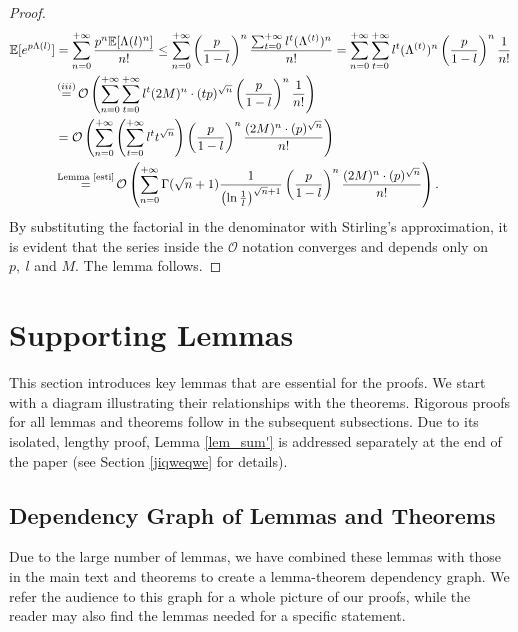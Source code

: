 \documentclass{article} %
\begin{document}
\begin{proof}
\begin{align*}
\mathbb{E}[e^{p\Lambda(l)}] & = \sum_{n=0}^{+\infty} \frac{p^{n}\mathbb{E}[\Lambda(l)^n]}{n!}\le\sum_{n=0}^{+\infty} \left(\frac{p}{1-l}\right)^{n}\frac{\sum_{t=0}^{+\infty}l^{t}(\Lambda^{(t)})^{n}}{n!}  =\sum_{n=0}^{+\infty} \sum_{t=0}^{+\infty}l^{t}(\Lambda^{(t)})^{n}\left(\frac{p}{1-l}\right)^{n}\frac{1}{n!}  \\&\mathop{=}^{(iii)}\mathcal{O}\left(\sum_{n=0}^{+\infty} \sum_{t=0}^{+\infty}l^{t}(2M)^{n}\cdot (tp)^{\sqrt{n}}\left(\frac{p}{1-l}\right)^{n}\frac{1}{n!}\right)\\&=\mathcal{O}\left(\sum_{n=0}^{+\infty} \left(\sum_{t=0}^{+\infty}l^{t}t^{\sqrt{n}}\right)\left(\frac{p}{1-l}\right)^{n}\frac{(2M)^{n}\cdot (p)^{\sqrt{n}}}{n!}\right)\\&\mathop{=}^{\text{Lemma \ref{esti}}}\mathcal{O}\left(\sum_{n=0}^{+\infty} \Gamma(\sqrt{n}+1)\frac{1}{\left( \ln \frac{1}{l} \right)^{\sqrt{n} + 1}}\left(\frac{p}{1-l}\right)^{n}\frac{(2M)^{n}\cdot (p)^{\sqrt{n}}}{n!}\right).
\end{align*}
By substituting the factorial in the denominator with Stirling's approximation, it is evident that the series inside the $\mathcal{O}$ notation converges and depends only on $p,\ l$ and $M$. The lemma follows.
\end{proof}


\section{Supporting Lemmas}
This section introduces key lemmas that are essential for the proofs.  We start with a diagram illustrating their relationships with the theorems. Rigorous proofs for all lemmas and theorems follow in the subsequent subsections. Due to its isolated, lengthy proof, Lemma \ref{lem_sum'} is addressed separately at the end of the paper (see Section \ref{jiqweqwe} for details).

\subsection{Dependency Graph of Lemmas and Theorems}

Due to the large number of lemmas, we have combined these lemmas with those in the main text and theorems to create a lemma-theorem dependency graph. We refer the audience to this graph for a whole picture of our proofs, while the reader may also find the lemmas needed for a specific statement.
\end{document}
